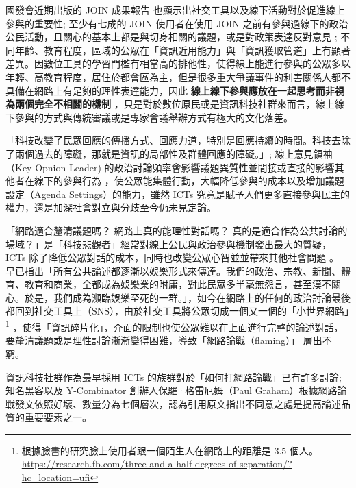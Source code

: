 \documentclass[12pt,a4paper]{article}
\begin{document}
國發會近期出版的 JOIN 成果報告 \citep*{chuang18,lin18a} 也顯示出社交工具以及線下活動對於促進線上參與的重要性; 至少有七成的 JOIN 使用者在使用 JOIN 之前有參與過線下的政治公民活動，且關心的基本上都是與切身相關的議題，或是對政策表達反對意見 ; 不同年齡、教育程度，區域的公眾在「資訊近用能力」與「資訊獲取管道」上有顯著差異。因數位工具的學習門檻有相當高的排他性，使得線上能進行參與的公眾多以年輕、高教育程度，居住於都會區為主，但是很多重大爭議事件的利害關係人都不具備在網路上有足夠的理性表達能力，因此 \textbf{線上線下參與應放在一起思考而非視為兩個完全不相關的機制} ，只是對於數位原民或是資訊科技社群來而言，線上線下參與的方式與傳統審議或是專家會議舉辦方式有極大的文化落差。

「科技改變了民眾回應的傳播方式、回應力道，特別是回應持續的時間。科技去除了兩個過去的障礙，那就是資訊的局部性及群體回應的障礙。」\citep*[p.141]{xue11_xiang}; 線上意見領袖（Key Opnion Leader) 的政治討論頻率會影響議題異質性並間接或直接的影響其他者在線下的參與行為 \citep*{lin18b} ，使公眾能集體行動，大幅降低參與的成本以及增加議題設定（Agenda Settings）的能力，雖然 ICTs 究竟是賦予人們更多直接參與民主的權力，還是加深社會對立與分歧至今仍未見定論。\citep{chang06}

「網路適合釐清議題嗎？ 網路上真的能理性對話嗎？ 真的是適合作為公共討論的場域？」是「科技悲觀者」經常對線上公民與政治參與機制發出最大的質疑，ICTs 除了降低公眾對話的成本，同時也改變公眾心智並並帶來其他社會問題 \citep*{stev11} 。 \citep*{neil16} 早已指出「所有公共論述都逐漸以娛樂形式來傳達。我們的政治、宗教、新聞、體育、教育和商業，全都成為娛樂業的附庸，對此民眾多半毫無怨言，甚至漠不關心。於是，我們成為瀕臨娛樂至死的一群。」，如今在網路上的任何的政治討論最後都回到社交工具上（SNS），由於社交工具將公眾切成一個又一個的「小世界網路」\footnote{根據臉書的研究臉上使用者跟一個陌生人在網路上的距離是 3.5 個人。 \url{https://research.fb.com/three-and-a-half-degrees-of-separation/?hc\_location=ufi}} ，使得「資訊碎片化」，介面的限制也使公眾難以在上面進行完整的論述對話，要釐清議題或是理性討論漸漸變得困難，導致「網路論戰（flaming）」\citep*{wiki:flaming} 層出不窮。

資訊科技社群作為最早採用 ICTs 的族群對於「如何打網路論戰」已有許多討論; 知名黑客以及 Y-Combinator 創辦人保羅·格雷厄姆（Paul Graham）根據網路論戰發文依照好壞、數量分為七個層次，認為引用原文指出不同意之處是提高論述品質的重要要素之一。\citep*{paul08}
\end{document}
